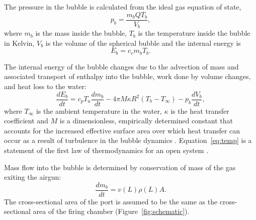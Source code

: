 \documentclass[10pt]{article}
\begin{document}
The pressure in the bubble is calculated from the ideal gas equation of state,
\begin{equation}
p_b = \frac{m_b Q T_b}{V_b},
\label{eq:bubble eos}
\end{equation}
where $m_b$ is the mass inside the bubble, $T_b$ is the temperature inside the bubble in Kelvin, $V_b$ is the volume of the spherical bubble and the internal energy is
\begin{equation}
E_b = c_v m_b T_b.
\label{eq:bubble int energy}
\end{equation}

The internal energy of the bubble changes due to the advection of mass and associated transport of enthalpy into the bubble, work done by volume changes, and heat loss to the water:
\begin{equation}
\frac{dE_b}{dt} = c_p T_a \frac{dm_b}{dt} - 4\pi M \kappa R^2 (T_b-T_\infty) - p_b \frac{dV_b}{dt},
\label{eq:temp}
\end{equation}
where $T_\infty$ is the ambient temperature in the water, $\kappa$ is the heat transfer coefficient \citep{Ni2011, deGraaf2014} and $M$ is a dimensionless, empirically determined constant that accounts for the increased effective surface area over which heat transfer can occur as a result of turbulence in the bubble dynamics \citep{Laws1990}. Equation~\ref{eq:temp} is a statement of the first law of thermodynamics for an open system \citep{Tolhoek1952}.

Mass flow into the bubble is determined by conservation of mass of the gas exiting the airgun:
\begin{equation}
\frac{dm_b}{dt} = v(L) \rho(L) A.
\label{eq:mass flow}
\end{equation}
The cross-sectional area of the port is assumed to be the same as the cross-sectional area of the firing chamber (Figure~\ref{fig:schematic}).
\end{document}
